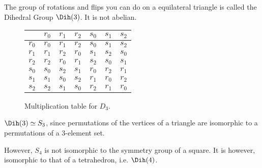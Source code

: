   \begin{example}
    The group of rotations and flips you can do on a equilateral triangle is called the Dihedral Group $\Dih(3)$. It is not abelian. 

    \begin{figure}[H]
      \centering 
      \begin{tabular}{|c|c|c|c|c|c|c|}
        \hline
        & $r_0$ & $r_1$ & $r_2$ & $s_0$ & $s_1$ & $s_2$ \\
        \hline
        $r_0$ & $r_0$ & $r_1$ & $r_2$ & $s_0$ & $s_1$ & $s_2$ \\
        \hline
        $r_1$ & $r_1$ & $r_2$ & $r_0$ & $s_1$ & $s_2$ & $s_0$ \\
        \hline
        $r_2$ & $r_2$ & $r_0$ & $r_1$ & $s_2$ & $s_0$ & $s_1$ \\
        \hline
        $s_0$ & $s_0$ & $s_2$ & $s_1$ & $r_0$ & $r_2$ & $r_1$ \\
        \hline
        $s_1$ & $s_1$ & $s_0$ & $s_2$ & $r_1$ & $r_0$ & $r_2$ \\
        \hline
        $s_2$ & $s_2$ & $s_1$ & $s_0$ & $r_2$ & $r_1$ & $r_0$ \\
        \hline
      \end{tabular}
      \caption{Multiplication table for $D_3$. } 
      \label{fig:triangle_d3}
    \end{figure}
  \end{example} 

  \begin{example}
    $\Dih(3) \simeq S_{3}$, since permutations of the vertices of a triangle are isomorphic to a permutations of a 3-element set. 
  \end{example}  

  However, $S_4$ is not isomorphic to the symmetry group of a square. It is however, isomorphic to that of a tetrahedron, i.e. $\Dih(4)$. 

